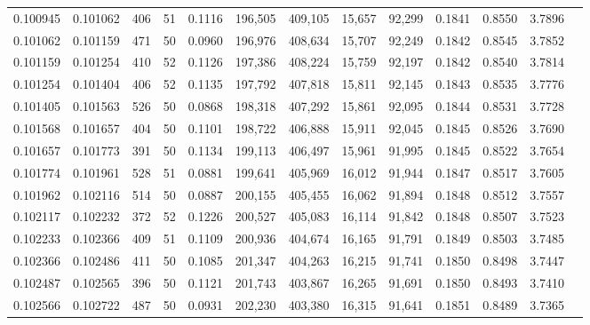 \begin{tabular}{rrrrrrrrrrrrr}
0.100945 & 0.101062 &   406 &  51 &                                     0.1116 & 196,505 & 409,105 &  15,657 &  92,299 & 0.1841 & 0.8550 & 3.7896 \\
0.101062 & 0.101159 &   471 &  50 &                                     0.0960 & 196,976 & 408,634 &  15,707 &  92,249 & 0.1842 & 0.8545 & 3.7852 \\
0.101159 & 0.101254 &   410 &  52 &                                     0.1126 & 197,386 & 408,224 &  15,759 &  92,197 & 0.1842 & 0.8540 & 3.7814 \\
0.101254 & 0.101404 &   406 &  52 &                                     0.1135 & 197,792 & 407,818 &  15,811 &  92,145 & 0.1843 & 0.8535 & 3.7776 \\
0.101405 & 0.101563 &   526 &  50 &                                     0.0868 & 198,318 & 407,292 &  15,861 &  92,095 & 0.1844 & 0.8531 & 3.7728 \\
0.101568 & 0.101657 &   404 &  50 &                                     0.1101 & 198,722 & 406,888 &  15,911 &  92,045 & 0.1845 & 0.8526 & 3.7690 \\
0.101657 & 0.101773 &   391 &  50 &                                     0.1134 & 199,113 & 406,497 &  15,961 &  91,995 & 0.1845 & 0.8522 & 3.7654 \\
0.101774 & 0.101961 &   528 &  51 &                                     0.0881 & 199,641 & 405,969 &  16,012 &  91,944 & 0.1847 & 0.8517 & 3.7605 \\
0.101962 & 0.102116 &   514 &  50 &                                     0.0887 & 200,155 & 405,455 &  16,062 &  91,894 & 0.1848 & 0.8512 & 3.7557 \\
0.102117 & 0.102232 &   372 &  52 &                                     0.1226 & 200,527 & 405,083 &  16,114 &  91,842 & 0.1848 & 0.8507 & 3.7523 \\
0.102233 & 0.102366 &   409 &  51 &                                     0.1109 & 200,936 & 404,674 &  16,165 &  91,791 & 0.1849 & 0.8503 & 3.7485 \\
0.102366 & 0.102486 &   411 &  50 &                                     0.1085 & 201,347 & 404,263 &  16,215 &  91,741 & 0.1850 & 0.8498 & 3.7447 \\
0.102487 & 0.102565 &   396 &  50 &                                     0.1121 & 201,743 & 403,867 &  16,265 &  91,691 & 0.1850 & 0.8493 & 3.7410 \\
0.102566 & 0.102722 &   487 &  50 &                                     0.0931 & 202,230 & 403,380 &  16,315 &  91,641 & 0.1851 & 0.8489 & 3.7365 \\

\end{tabular}
